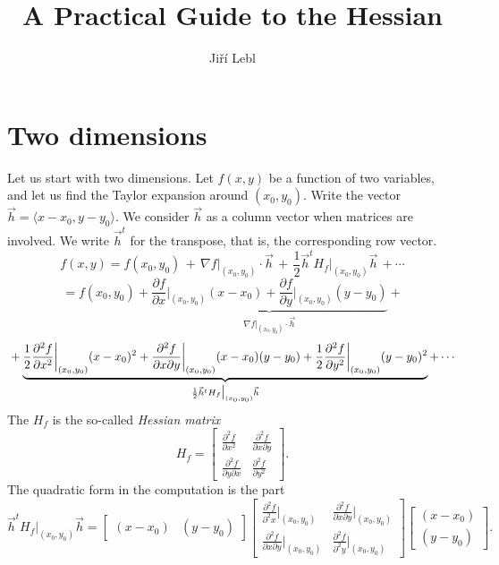 \documentclass[12pt]{article}
\title{A Practical Guide to the Hessian}
\author{Ji\v{r}\'i Lebl}
\begin{document}
\maketitle

\section{Two dimensions}

Let us start with two dimensions.
Let $f(x,y)$ be a function of two variables, and let us
find the
Taylor expansion around $(x_0,y_0)$.
Write the vector $\vec{h} = \langle x-x_0, y-y_0 \rangle$.  We
consider $\vec{h}$ as a column vector when matrices are involved.
We write $\vec{h}^t$ for the transpose, that is, the corresponding
row vector.
$$
f(x,y) = f(x_0,y_0) \, + \,
\nabla f\big|_{(x_0,y_0)} \cdot \vec{h}
\, + \,
\frac{1}{2} \vec{h}^{t} H_f\big|_{(x_0,y_0)} \vec{h} \,
+ \cdots
$$
$$
 = f(x_0,y_0) +
\underbrace{\frac{\partial f}{\partial x}\bigg|_{(x_0,y_0)} (x-x_0) +
\frac{\partial f}{\partial y}\bigg|_{(x_0,y_0)} (y-y_0)}_{\nabla
f\big|_{(x_0,y_0)} \cdot \vec{h}}
+ {}
$$
$$
{} +
\underbrace{%
\frac{1}{2} \frac{\partial^2 f}{\partial x^2}\bigg|_{(x_0,y_0)} (x-x_0)^2 +
\frac{\partial^2 f}{\partial x \partial y}\bigg|_{(x_0,y_0)} (x-x_0)(y-y_0) +
\frac{1}{2} \frac{\partial^2 f}{\partial y^2}\bigg|_{(x_0,y_0)} (y-y_0)^2}_{%
\frac{1}{2} \vec{h}^{t} H_f\big|_{(x_0,y_0)} \vec{h}}
+
\cdots
$$
The $H_f$ is the so-called \emph{Hessian matrix}
\begin{equation*}
H_f
=
\begin{bmatrix}
\frac{\partial^2 f}{\partial x^2} &
\frac{\partial^2 f}{\partial x \partial y} \\
\frac{\partial^2 f}{\partial y \partial x} &
\frac{\partial^2 f}{\partial y^2}
\end{bmatrix}
.
\end{equation*}
The quadratic form in the computation is the part
\begin{equation*}
\vec{h}^{t} H_f \big|_{(x_0,y_0)} \vec{h}
=
\begin{bmatrix}
(x-x_0) & (y-y_0)
\end{bmatrix}
\begin{bmatrix}
\frac{\partial^2 f}{\partial^2 x}\big|_{(x_0,y_0)} &
\frac{\partial^2 f}{\partial x \partial y}\big|_{(x_0,y_0)} \\
\frac{\partial^2 f}{\partial x \partial y}\big|_{(x_0,y_0)} &
\frac{\partial^2 f}{\partial^2 y}\big|_{(x_0,y_0)}
\end{bmatrix}
\begin{bmatrix}
(x-x_0) \\ (y-y_0)
\end{bmatrix}
.
\end{equation*}
\end{document}
